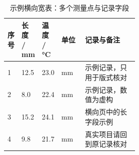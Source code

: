 \begin{landscape}
  \begin{table}[htbp]
    \centering
    \caption{示例横向宽表：多个测量点与记录字段}\label{tab:landscape}
    \begin{tabularx}{\linewidth}{@{}p{0.10\linewidth}p{0.12\linewidth}p{0.12\linewidth}p{0.18\linewidth}X@{}}
      \toprule
      序号 & 长度 / \si{\milli\metre} & 温度 / \si{\celsius} & 单位 & 记录与备注 \\
      \midrule
      1 & 12.5 & 23.0 & \si{\milli\metre} & 示例记录，只用于版式核对 \\
      2 & 8.0 & 22.4 & \si{\milli\metre} & 示例记录，数值为虚构 \\
      3 & 15.2 & 24.1 & \si{\milli\metre} & 横向页中的长字段示例 \\
      4 & 9.8 & 21.7 & \si{\milli\metre} & 真实项目请回到原记录核对 \\
      \bottomrule
    \end{tabularx}
  \end{table}
\end{landscape}
